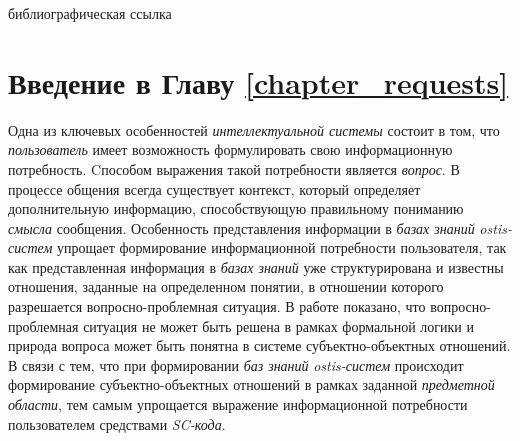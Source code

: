 \begin{SCn}
\bigskip

\begin{scnrelfromlist}{библиографическая ссылка}
\end{scnrelfromlist}
	
\end{SCn}

\section*{Введение в Главу \ref{chapter_requests}}

Одна из ключевых особенностей \textit{интеллектуальной системы} состоит в том, что \textit{пользователь} имеет возможность формулировать свою информационную потребность. Cпособом выражения такой потребности является \textit{вопрос}. В процессе общения всегда существует контекст, который определяет дополнительную информацию, способствующую правильному пониманию \textit{смысла} сообщения. Особенность представления информации в \textit{базах знаний} \textit{ostis-систем} упрощает формирование информационной потребности пользователя, так как представленная информация в \textit{базах знаний} уже структурирована и известны отношения, заданные на определенном понятии, в отношении которого разрешается вопросно-проблемная ситуация. В работе  показано, что вопросно-проблемная ситуация не может быть решена в рамках формальной логики и природа вопроса может быть понятна в системе субъектно-объектных отношений. В связи с тем, что при формировании \textit{баз знаний} \textit{ostis-систем} происходит формирование субъектно-объектных отношений в рамках заданной \textit{предметной области}, тем самым упрощается выражение информационной потребности пользователем средствами \textit{SC-кода}.   


